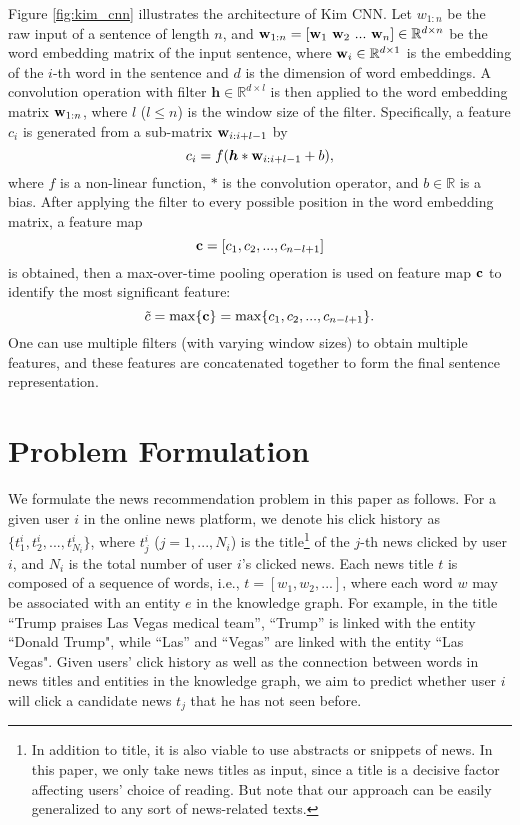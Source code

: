 \documentclass[sigconf]{acmart}
\begin{document}
		Figure \ref{fig:kim_cnn} illustrates the architecture of Kim CNN.
		Let $w_{1:n}$ be the raw input of a sentence of length $n$, and ${\bf w}_{1:n} = [{\bf w}_1 \ {\bf w}_2 \ ... \ {\bf w}_n] \in \mathbb R^{d \times n}$ be the word embedding matrix of the input sentence, where ${\bf w}_i \in \mathbb R^{d \times 1}$ is the embedding of the $i$-th word in the sentence and $d$ is the dimension of word embeddings.
		A convolution operation with filter ${\bm h} \in \mathbb R^{d \times l}$ is then applied to the word embedding matrix ${\bf w}_{1:n}$, where $l$ ($l \leq n$) is the window size of the filter.
		Specifically, a feature $c_i$ is generated from a sub-matrix ${\bf w}_{i:i+l-1}$ by
		\begin{equation}
			c_i = f ({\bm h} * {\bf w}_{i:i+l-1} + b),
		\end{equation}
		where $f$ is a non-linear function, $*$ is the convolution operator, and $b \in \mathbb R$ is a bias.
		After applying the filter to every possible position in the word embedding matrix, a feature map
		\begin{equation}
			{\bf c} = [c_1, c_2, ..., c_{n-l+1}]
		\end{equation}
		is obtained, then a max-over-time pooling operation is used on feature map $\bf c$ to identify the most significant feature:
		\begin{equation}
			\tilde c = \max \{ {\bf c} \} = \max \{ c_1, c_2, ..., c_{n-l+1} \}.
		\end{equation}
		One can use multiple filters (with varying window sizes) to obtain multiple features, and these features are concatenated together to form the final sentence representation.
		
	
	
	\section{Problem Formulation}
		We formulate the news recommendation problem in this paper as follows.
		For a given user $i$ in the online news platform, we denote his click history as $\{ t_1^i, t_2^i, ..., t_{N_i}^i \}$, where $t_j^i$ ($j = 1, ..., N_i$) is the title\footnote{In addition to title, it is also viable to use abstracts or snippets of news. In this paper, we only take news titles as input, since a title is a decisive factor affecting users' choice of reading. But note that our approach can be easily generalized to any sort of news-related texts.} of the $j$-th news clicked by user $i$, and $N_i$ is the total number of user $i$'s clicked news.
		Each news title $t$ is composed of a sequence of words, i.e., $t = [w_1, w_2, ...]$, where each word $w$ may be associated with an entity $e$ in the knowledge graph.
		For example, in the title ``\textsf{Trump praises Las Vegas medical team}'', ``\textsf{Trump}'' is linked with the entity ``\textsf{Donald Trump}", while ``\textsf{Las}'' and ``\textsf{Vegas}'' are linked with the entity ``\textsf{Las Vegas}".
		Given users' click history as well as the connection between words in news titles and entities in the knowledge graph, we aim to predict whether user $i$ will click a candidate news $t_j$ that he has not seen before.
\end{document}
